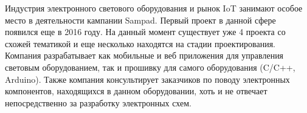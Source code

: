 Индустрия электронного светового оборудования и рынок IoT занимают особое место в деятельности кампании Sampad. Первый проект в данной сфере появился еще в 2016 году. На данный момент существует уже 4 проекта со схожей тематикой и еще несколько находятся на стадии проектирования. Компания разрабатывает как мобильные и веб приложения для управления световым оборудованием, так и прошивку для самого оборудования (C/C++, Arduino). Также компания консультирует заказчиков по поводу электронных компонентов, находящихся в данном оборудовании, хоть и не отвечает непосредственно за разработку электронных схем.